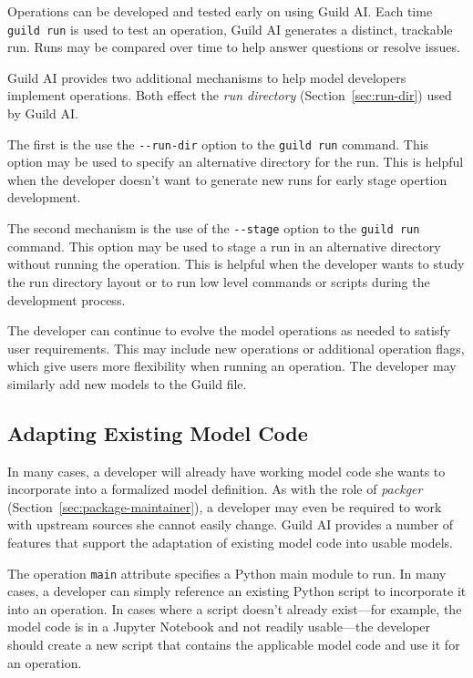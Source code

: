 \documentclass{article}
\begin{document}
Operations can be developed and tested early on using Guild AI. Each
time \verb|guild run| is used to test an operation, Guild AI generates
a distinct, trackable run. Runs may be compared over time to help
answer questions or resolve issues.

Guild AI provides two additional mechanisms to help model developers
implement operations. Both effect the \emph{run directory}
(Section~\ref{sec:run-dir}) used by Guild AI.

The first is the use the \verb|--run-dir| option
to the \verb|guild run| command. This option may be used to specify an
alternative directory for the run. This is helpful when the developer
doesn't want to generate new runs for early stage opertion
development.

The second mechanism is the use of the \verb|--stage| option to the
\verb|guild run| command. This option may be used to stage a run in an
alternative directory without running the operation. This is helpful
when the developer wants to study the run directory layout or to run
low level commands or scripts during the development process.

The developer can continue to evolve the model operations as needed to
satisfy user requirements. This may include new operations or
additional operation flags, which give users more flexibility when
running an operation. The developer may similarly add new models to
the Guild file.

\subsection{Adapting Existing Model Code}

In many cases, a developer will already have working model code she
wants to incorporate into a formalized model definition. As with the
role of \emph{packger} (Section~\ref{sec:package-maintainer}), a
developer may even be required to work with upstream sources she
cannot easily change. Guild AI provides a number of features that
support the adaptation of existing model code into usable models.

The operation \verb|main| attribute specifies a Python main module to
run. In many cases, a developer can simply reference an existing
Python script to incorporate it into an operation. In cases where a
script doesn't already exist---for example, the model code is in a
Jupyter Notebook and not readily usable---the developer should create
a new script that contains the applicable model code and use it for an
operation.
\end{document}
